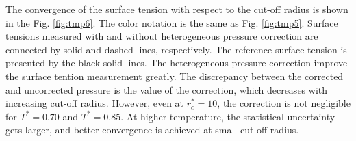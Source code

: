 \documentclass[aps,pre,preprint]{revtex4}
\begin{document}
The convergence of the surface tension with respect to the cut-off
radius is shown in the Fig. \ref{fig:tmp6}. The color notation is the
same as Fig. \ref{fig:tmp5}.  Surface tensions measured with and
without heterogeneous pressure correction are connected by solid and
dashed lines, respectively.  The reference surface tension is
presented by the black solid lines. The heterogeneous pressure
correction improve the surface tention measurement greatly. The
discrepancy between the corrected and uncorrected pressure is the
value of the correction, which decreases with increasing cut-off
radius. However, even at $r_c^\ast=10$, the correction is not
negligible for $T^\ast = 0.70$ and $T^\ast = 0.85$. At higher
temperature, the statistical uncertainty gets larger, and better
convergence is achieved at small cut-off radius.

\end{document}
